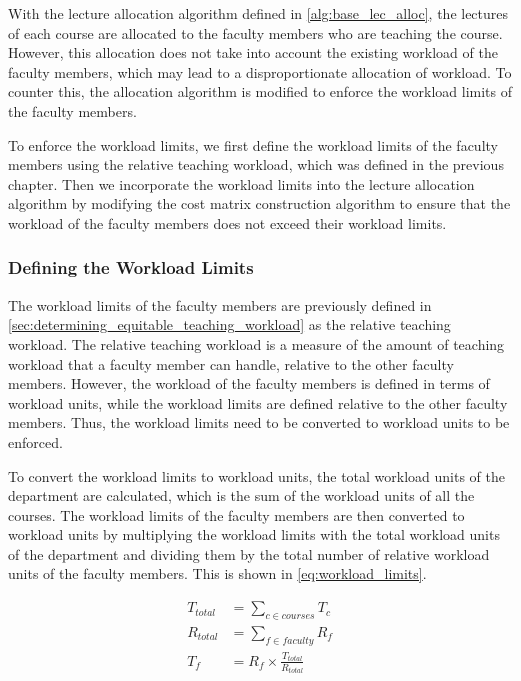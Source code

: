 With the lecture allocation algorithm defined in \autoref{alg:base_lec_alloc}, the lectures of each course are allocated to the faculty members who are teaching the course. However, this allocation does not take into account the existing workload of the faculty members, which may lead to a disproportionate allocation of workload. To counter this, the allocation algorithm is modified to enforce the workload limits of the faculty members.

To enforce the workload limits, we first define the workload limits of the faculty members using the relative teaching workload, which was defined in the previous chapter. Then we incorporate the workload limits into the lecture allocation algorithm by modifying the cost matrix construction algorithm to ensure that the workload of the faculty members does not exceed their workload limits.

\subsubsection{Defining the Workload Limits}

The workload limits of the faculty members are previously defined in \autoref{sec:determining_equitable_teaching_workload} as the relative teaching workload. The relative teaching workload is a measure of the amount of teaching workload that a faculty member can handle, relative to the other faculty members. However, the workload of the faculty members is defined in terms of workload units, while the workload limits are defined relative to the other faculty members. Thus, the workload limits need to be converted to workload units to be enforced.

To convert the workload limits to workload units, the total workload units of the department are calculated, which is the sum of the workload units of all the courses. The workload limits of the faculty members are then converted to workload units by multiplying the workload limits with the total workload units of the department and dividing them by the total number of relative workload units of the faculty members. This is shown in \autoref{eq:workload_limits}.

\begin{equation}
  \label{eq:workload_limits}
  \begin{aligned}
    T_{total} & = \sum_{c \in courses} T_c               \\
    R_{total} & = \sum_{f \in faculty} R_f               \\
    T_f       & = R_f \times \frac{T_{total}}{R_{total}}
  \end{aligned}
\end{equation}

